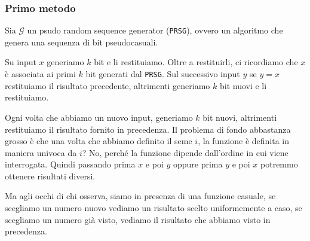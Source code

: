 \subsubsection{Primo metodo}
Sia $\mathcal{G}$ un psudo random sequence generator (\texttt{PRSG}), ovvero un algoritmo che
genera una sequenza di bit pseudocasuali.
\begin{figure}[H]
    \centering
  \end{figure}
Su input $x$ generiamo $k$ bit e li restituiamo. Oltre a restituirli, ci ricordiamo che $x$ è 
associata ai primi $k$ bit generati dal \texttt{PRSG}. Sul successivo input $y$ se $y = x$
restituiamo il risultato precedente, altrimenti generiamo $k$ bit nuovi e li restituiamo.

Ogni volta che abbiamo un nuovo input, generiamo $k$ bit nuovi, altrimenti restituiamo il risultato
fornito in precedenza. 
Il problema di fondo abbastanza grosso è che una volta che abbiamo definito il seme $i$, 
la funzione è definita in maniera univoca da $i$? No, perché la funzione dipende dall'ordine 
in cui viene interrogata. Quindi passando prima $x$ e poi $y$ oppure prima $y$ e poi $x$
potremmo ottenere risultati diversi.

Ma agli occhi di chi osserva, siamo in presenza di una funzione casuale, se scegliamo un numero 
nuovo vediamo un risultato scelto uniformemente a caso, se scegliamo un numero già visto,
vediamo il risultato che abbiamo visto in precedenza.

